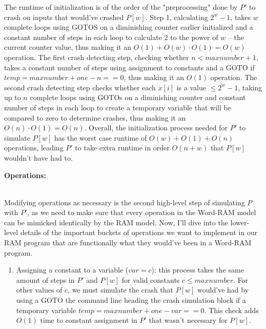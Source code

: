 \documentclass[11pt]{article}
\begin{document}
\begin{enumerate}
The runtime of initialization is of the order of the "preprocessing" done by $P'$ to crash on inputs that would've crashed $P[w]$. Step 1, calculating $2^w - 1$, takes $w$ complete loops using GOTOS on a diminishing counter earlier initialized and a constant number of steps in each loop to calculate 2 to the power of $w$ – the current counter value, thus making it an $O(1) + O(w) \cdot O(1) = O(w)$ operation. The first crash detecting step, checking whether $n < maxnumber + 1$, takes a constant number of steps using assignment to constants and a GOTO if $temp = maxnumber + one - n == 0$, thus making it an $O(1)$ operation. The second crash detecting step checks whether each $x[i]$ is a value $\leq 2^w - 1$, taking up to $n$ complete loops using GOTOs on a diminishing counter and constant number of steps in each loop to create a temporary variable that will be compared to zero to determine crashes, thus making it an $O(n) \cdot O(1) = O(n)$. Overall, the initialization process needed for $P'$ to simulate $P[w]$ has the worst case runtime of $O(w) + O(1) + O(n)$ operations, leading $P'$ to take extra runtime in order $O(n + w)$ that $P[w]$ wouldn't have had to. \\

\begin{center}
\textbf{    Operations:}
\end{center} \\

Modifying operations as necessary is the second high-level step of simulating $P$ with $P'$, as we need to make sure that every operation in the Word-RAM model can be mimicked identically by the RAM model. Now, I'll dive into the lower-level details of the important buckets of operations we want to implement in our RAM program that are functionally what they would've been in a Word-RAM program.

\begin{enumerate}
    
\item Assigning a constant to a variable ($var = c$): this process takes the same amount of steps in $P'$ and $P[w]$ for valid constants $c \leq maxnumber$. For other values of $c$, we must simulate the crash that $P[w]$ would've had by using a GOTO the command line heading the crash simulation block if a temporary variable $temp = maxnumber + one - var == 0$. This check adds $O(1)$ time to constant assignment in $P'$ that wasn't necessary for $P[w]$. \\


\end{enumerate}
\end{enumerate}
\end{document}
